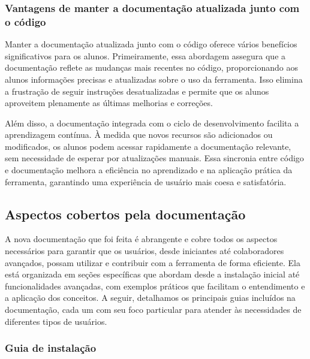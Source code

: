 \documentclass[
	12pt,				%
	oneside,			%
	a4paper,			%
	english,			%
	french,				%
	spanish,			%
	brazil				%
	]{abntex2}
\begin{document}
\hypertarget{vantagens-de-manter-a-documentauxe7uxe3o-atualizada-junto-com-o-cuxf3digo}{%
\subsubsection{Vantagens de manter a documentação atualizada junto com o
código}\label{vantagens-de-manter-a-documentauxe7uxe3o-atualizada-junto-com-o-cuxf3digo}}

Manter a documentação atualizada junto com o código oferece vários
benefícios significativos para os alunos. Primeiramente, essa abordagem
assegura que a documentação reflete as mudanças mais recentes no código,
proporcionando aos alunos informações precisas e atualizadas sobre o uso
da ferramenta. Isso elimina a frustração de seguir instruções
desatualizadas e permite que os alunos aproveitem plenamente as últimas
melhorias e correções.

Além disso, a documentação integrada com o ciclo de desenvolvimento
facilita a aprendizagem contínua. À medida que novos recursos são
adicionados ou modificados, os alunos podem acessar rapidamente a
documentação relevante, sem necessidade de esperar por atualizações
manuais. Essa sincronia entre código e documentação melhora a eficiência
no aprendizado e na aplicação prática da ferramenta, garantindo uma
experiência de usuário mais coesa e satisfatória.

\hypertarget{aspectos-cobertos-pela-documentauxe7uxe3o}{%
\subsection{Aspectos cobertos pela
documentação}\label{aspectos-cobertos-pela-documentauxe7uxe3o}}

A nova documentação que foi feita é abrangente e cobre todos os aspectos
necessários para garantir que os usuários, desde iniciantes até
colaboradores avançados, possam utilizar e contribuir com a ferramenta
de forma eficiente. Ela está organizada em seções específicas que
abordam desde a instalação inicial até funcionalidades avançadas, com
exemplos práticos que facilitam o entendimento e a aplicação dos
conceitos. A seguir, detalhamos os principais guias incluídos na
documentação, cada um com seu foco particular para atender às
necessidades de diferentes tipos de usuários.

\hypertarget{guia-de-instalauxe7uxe3o}{%
\subsubsection{Guia de instalação}\label{guia-de-instalauxe7uxe3o}}
\end{document}
